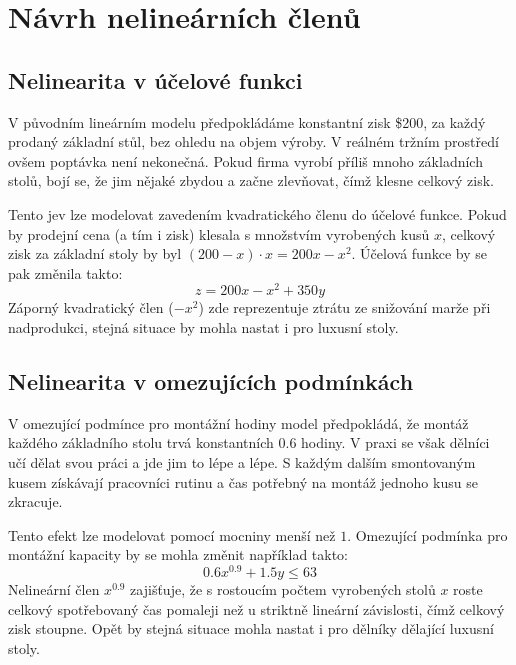 \documentclass[../sablona-main.tex]{subfiles}
\begin{document}
\section{Návrh nelineárních členů}
\subsection{Nelinearita v účelové funkci}
V původním lineárním modelu předpokládáme konstantní zisk \$200, za každý prodaný základní stůl, bez ohledu na objem výroby. V reálném tržním prostředí ovšem poptávka není nekonečná. Pokud firma vyrobí příliš mnoho základních stolů, bojí se, že jim nějaké zbydou a začne zlevňovat, čímž klesne celkový zisk.

Tento jev lze modelovat zavedením kvadratického členu do účelové funkce. Pokud by prodejní cena (a tím i zisk) klesala s množstvím vyrobených kusů $x$, celkový zisk za základní stoly by byl $(200 - x) \cdot x = 200x - x^2$. Účelová funkce by se pak změnila takto:
$$z = 200x - x^2 + 350y$$
Záporný kvadratický člen ($-x^2$) zde reprezentuje ztrátu ze snižování marže při nadprodukci, stejná situace by mohla nastat i pro luxusní stoly.

\subsection{Nelinearita v omezujících podmínkách}
V omezující podmínce pro montážní hodiny model předpokládá, že montáž každého základního stolu trvá konstantních $0.6$ hodiny. V praxi se však dělníci učí dělat svou práci a jde jim to lépe a lépe. S každým dalším smontovaným kusem získávají pracovníci rutinu a čas potřebný na montáž jednoho kusu se zkracuje.

Tento efekt lze modelovat pomocí mocniny menší než $1$. Omezující podmínka pro montážní kapacity by se mohla změnit například takto:
$$0.6x^{0.9} + 1.5y \le 63$$
Nelineární člen $x^{0.9}$ zajišťuje, že s rostoucím počtem vyrobených stolů $x$ roste celkový spotřebovaný čas pomaleji než u striktně lineární závislosti, čímž celkový zisk stoupne. Opět by stejná situace mohla nastat i pro dělníky dělající luxusní stoly.
\end{document}
